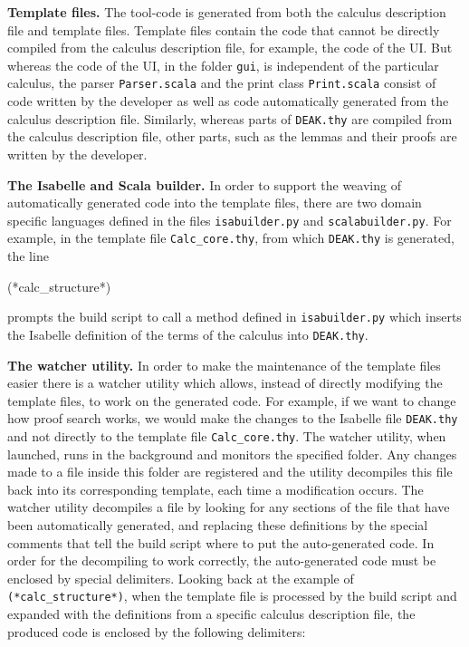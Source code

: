 \documentclass[runningheads,a4paper]{llncs}
\begin{document}
\medskip\noindent\textbf{Template files. } The tool-code is generated from both the calculus description file and template files. Template files contain the code that cannot be directly compiled from the calculus description file, for example, the code of the UI. But whereas the code of the UI, in the folder
\texttt{gui}, is independent of the particular calculus, the parser \texttt{Parser.scala} and the print class \texttt{Print.scala} consist of code written by the developer as well as code automatically generated from the calculus description file. Similarly, whereas parts of \texttt{DEAK.thy} are compiled from the calculus description file, other parts, such as the lemmas and their proofs are written by the developer.


\medskip\noindent\textbf{The Isabelle and Scala builder. } In order to support the weaving of automatically generated code into the template files, there are two domain specific languages defined in the files \texttt{isabuilder.py} and \texttt{scalabuilder.py}. For example, in the template file \texttt{Calc\_core.thy}, from which \texttt{DEAK.thy} is generated, the line

\begin{pyglist}[language = isabelle]
(*calc_structure*)
\end{pyglist}

\noindent prompts the build script to call a method defined in \texttt{isabuilder.py} which inserts the Isabelle definition of the terms of the calculus into \texttt{DEAK.thy}.

\medskip\noindent\textbf{The watcher utility. } In order to make the maintenance of the template files easier there is a watcher utility which allows, instead of directly modifying the template files, to work on the generated code. For example, if we want to change how proof search works, we would make the changes to the Isabelle file \texttt{DEAK.thy} and not directly to the template file \texttt{Calc\_core.thy}. The watcher utility, when launched, runs in the background and monitors the specified folder. Any changes made to a file inside this folder are registered and the utility decompiles this file back into its corresponding template, each time a modification occurs. The watcher utility decompiles a file by looking for any sections of the file that have been automatically generated, and replacing these definitions by the special comments that tell the build script where to put the auto-generated code. In order for the decompiling to work correctly, the auto-generated code must be enclosed by special delimiters. Looking back at the example of \texttt{(*calc\_structure*)}, when the template file is processed by the build script and expanded with the definitions from a specific calculus description file, the produced code is enclosed by the following delimiters:
\end{document}
